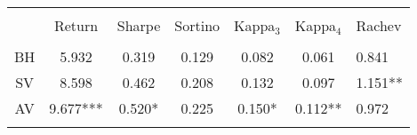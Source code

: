 

\begin{tabular}{@{\extracolsep{5pt}} ccccccH} 
\\
[-1.8ex]\hline 
\hline \\[-1.8ex] 
& Return & Sharpe & Sortino & Kappa$_{3}$ & Kappa$_{4}$ & Rachev \\ 
\hline \\[-1.8ex] 
BH & 5.932 & 0.319 & 0.129 & 0.082 & 0.061 & 0.841 \\ 
SV & 8.598 & 0.462 & 0.208 & 0.132 & 0.097 & 1.151** \\ 
AV & 9.677*** & 0.520* & 0.225 & 0.150* & 0.112** & 0.972 \\ 
\hline \\


\end{tabular} 

